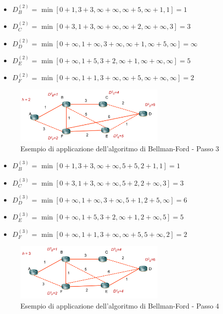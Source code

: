 \begin{itemize}
    \item $D_B^{(2)}$ = $\min [0 + 1, 3 + 3, \infty + \infty, \infty + 5, \infty + 1, 1] = 1$
    \item $D_C^{(2)}$ = $\min [0 + 3, 1 + 3, \infty + \infty, \infty + 2, \infty + \infty, 3] = 3$
    \item $D_D^{(2)}$ = $\min [0 + \infty, 1 + \infty, 3 + \infty, \infty + 1, \infty + 5, \infty] = \infty$
    \item $D_E^{(2)}$ = $\min [0 + \infty, 1 + 5, 3 + 2, \infty + 1, \infty + \infty, \infty] = 5$
    \item $D_F^{(2)}$ = $\min [0 + \infty, 1 + 1, 3 + \infty, \infty + 5, \infty + \infty, \infty] = 2$
\end{itemize}

\begin{figure}[h!]
    \centering
    \includegraphics[width=0.65\textwidth]{images/bf3.png}
    \caption{Esempio di applicazione dell'algoritmo di Bellman-Ford - Passo 3}
    \label{fig:bf3}
\end{figure}


\begin{itemize}
    \item $D_B^{(3)}$ = $\min [0 + 1, 3 + 3, \infty + \infty, 5 + 5, 2 + 1, 1] = 1$
    \item $D_C^{(3)}$ = $\min [0 + 3, 1 + 3, \infty + \infty, 5 + 2, 2 + \infty, 3] = 3$
    \item $D_D^{(3)}$ = $\min [0 + \infty, 1 + \infty, 3 + \infty, 5 + 1, 2 + 5, \infty] = 6$
    \item $D_E^{(3)}$ = $\min [0 + \infty, 1 + 5, 3 + 2, \infty + 1, 2 + \infty, 5] = 5$    
    \item $D_F^{(3)}$ = $\min [0 + \infty, 1 + 1, 3 + \infty, \infty + 5, 5 + \infty, 2] = 2$
\end{itemize}

\begin{figure}[h!]
    \centering
    \includegraphics[width=0.65\textwidth]{images/bf4.png}
    \caption{Esempio di applicazione dell'algoritmo di Bellman-Ford - Passo 4}
    \label{fig:bf4}
\end{figure}

